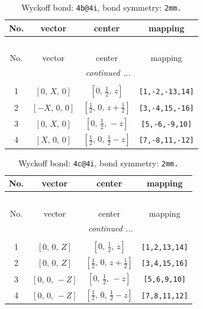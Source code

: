 \documentclass[fleqn,8pt]{jsarticle}
\begin{document}
\begin{longtable}{cccc}
\caption{Wyckoff bond: {\tt 4b@4i}, bond symmetry: {\tt 2mm.}}
 \\
 \hline \hline
No. & vector & center & mapping \\ \hline \endfirsthead

\multicolumn{3}{l}{\tablename\ \thetable{}} \\
 \hline \hline
No. & vector & center & mapping \\ \hline \endhead

 \hline \hline
\multicolumn{3}{r}{\footnotesize\it continued ...} \\ \endfoot

 \hline \hline
\multicolumn{3}{r}{} \\ \endlastfoot

1 & $\left[ 0,\, X,\, 0 \right]$ & $\left[ 0,\, \frac{1}{2},\, z \right]$ & {\tt [1,-2,-13,14]} \\ \hline
2 & $\left[ - X,\, 0,\, 0 \right]$ & $\left[ \frac{1}{2},\, 0,\, z + \frac{1}{2} \right]$ & {\tt [3,-4,15,-16]} \\ \hline
3 & $\left[ 0,\, X,\, 0 \right]$ & $\left[ 0,\, \frac{1}{2},\, - z \right]$ & {\tt [5,-6,-9,10]} \\ \hline
4 & $\left[ X,\, 0,\, 0 \right]$ & $\left[ \frac{1}{2},\, 0,\, \frac{1}{2} - z \right]$ & {\tt [7,-8,11,-12]} \\
\end{longtable}
\renewcommand{\arraystretch}{1.2}
\begin{longtable}{cccc}
\caption{Wyckoff bond: {\tt 4c@4i}, bond symmetry: {\tt 2mm.}}
 \\
 \hline \hline
No. & vector & center & mapping \\ \hline \endfirsthead

\multicolumn{3}{l}{\tablename\ \thetable{}} \\
 \hline \hline
No. & vector & center & mapping \\ \hline \endhead

 \hline \hline
\multicolumn{3}{r}{\footnotesize\it continued ...} \\ \endfoot

 \hline \hline
\multicolumn{3}{r}{} \\ \endlastfoot

1 & $\left[ 0,\, 0,\, Z \right]$ & $\left[ 0,\, \frac{1}{2},\, z \right]$ & {\tt [1,2,13,14]} \\ \hline
2 & $\left[ 0,\, 0,\, Z \right]$ & $\left[ \frac{1}{2},\, 0,\, z + \frac{1}{2} \right]$ & {\tt [3,4,15,16]} \\ \hline
3 & $\left[ 0,\, 0,\, - Z \right]$ & $\left[ 0,\, \frac{1}{2},\, - z \right]$ & {\tt [5,6,9,10]} \\ \hline
4 & $\left[ 0,\, 0,\, - Z \right]$ & $\left[ \frac{1}{2},\, 0,\, \frac{1}{2} - z \right]$ & {\tt [7,8,11,12]} \\
\end{longtable}
\end{document}
